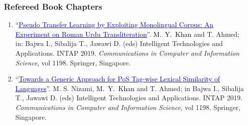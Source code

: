 \documentclass[a4paper, 10pt]{article}
\begin{document}
\subsubsection*{{Refereed Book Chapters}}
\begin{enumerate}[B\arabic*.] 
\itemsep = 0em
\item ``\href{https://doi.org/10.1007/978-981-15-5232-8_36}{\textcolor{MediumBlue}{Pseudo Transfer Learning by Exploiting Monolingual Corpus: An Experiment on Roman Urdu Transliteration}}''. \textcolor{Black}{M.~Y.~Khan} and T. Ahmed; in: Bajwa I., Sibalija T., Jawawi D. (eds) Intelligent Technologies and Applications. INTAP 2019. \emph{Communications in Computer and Information Science}, vol 1198. Springer, Singapore.

\item ``\href{https://doi.org/10.1007/978-981-15-5232-8_42}{\textcolor{MediumBlue}{Towards a Generic Approach for PoS Tag-wise Lexical Similarity of Languages}}''. M. S. Nizami, \textcolor{Black}{M.~Y.~Khan} and T. Ahmed; in Bajwa I., Sibalija T., Jawawi D. (eds) Intelligent Technologies and Applications. INTAP 2019. \emph{Communications in Computer and Information Science}, vol 1198. Springer, Singapore.

\end{enumerate}
\end{document}

